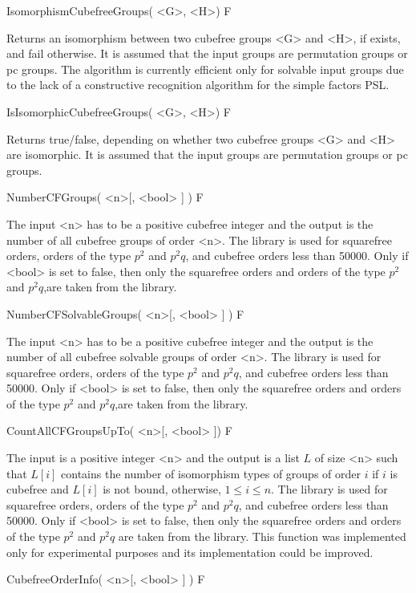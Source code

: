 \>IsomorphismCubefreeGroups( <G>, <H>) F

Returns an isomorphism between two cubefree groups <G> and <H>, if exists, and fail otherwise. It is assumed that the input groups are permutation groups or pc groups. The algorithm is currently efficient only for solvable input groups due to the lack of a constructive recognition algorithm for the simple factors PSL.




\>IsIsomorphicCubefreeGroups( <G>, <H>) F

Returns true/false, depending on whether two cubefree groups <G> and <H> are isomorphic. It is assumed that the input groups are permutation groups or pc groups. 


\>NumberCFGroups( <n>[, <bool> ] ) F

The input <n> has to be a positive cubefree integer and the output is the number of all
cubefree groups of order <n>. The {\SmallGroups} library  is used for squarefree
orders, orders of the type $p^2$ and $p^2q$, and cubefree orders less than
50000. Only if <bool> is set to false, then only  the squarefree
orders and orders of the type $p^2$ and $p^2q$,are taken from the {\SmallGroups}  library.


\>NumberCFSolvableGroups( <n>[, <bool> ] ) F 

The input <n> has to be a positive cubefree integer and the output is the number of all
cubefree solvable groups of order <n>. The {\SmallGroups} library  is used for squarefree
orders, orders of the type $p^2$ and $p^2q$, and cubefree orders less than
50000. Only if <bool> is set to false, then only  the squarefree
orders and orders of the type $p^2$ and $p^2q$,are taken from the {\SmallGroups} library.


\>CountAllCFGroupsUpTo( <n>[, <bool> ]) F  

The input is a positive integer <n> and the output is a list $L$ of size <n> such that
$L[i]$ contains the number of isomorphism types of groups of order $i$ if $i$
is cubefree and $L[i]$ is not bound, otherwise, $1\leq i \leq n$. The
{\SmallGroups} library  is used for squarefree orders, orders of the type $p^2$ and $p^2q$, and cubefree orders less than
50000. Only if <bool> is set to false, then only  the squarefree
orders and orders of the type $p^2$ and $p^2q$ are taken from the
{\SmallGroups} library. This function was implemented only for experimental
purposes and its implementation could be improved.


\>CubefreeOrderInfo( <n>[, <bool> ] ) F

